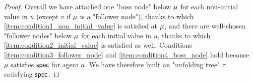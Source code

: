 \begin{proof}
	Overall we have attached one "boss node" below $\mu$ for each non-initial value in $u$ (except $v$ if $\mu$ is a "follower node"), thanks to which \ref{item:condition1_non_initial_value} is satisfied at $\mu$, and there are well-chosen "follower nodes" below $\mu$ for each initial value in $u$, thanks to which \ref{item:condition2_initial_value} is satisfied as well. Conditions \ref{item:condition3_follower_node} and \ref{item:condition4_boss_node} hold because $\rho$ satisfies $\mathsf{spec}$ for agent $a$.
	We have therefore built an "unfolding tree" $\tau$ satisfying $\mathsf{spec}$. 
	\end{proof}
